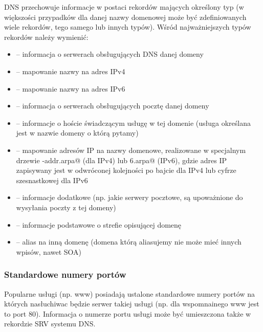 DNS przechowuje informacje w postaci rekordów mających określony typ (w większości przypadków dla danej nazwy domenowej może być zdefiniowanych wiele rekordów, tego samego lub innych typów).
Wśród najważniejszych typów rekordów należy wymienić:
\begin{itemize}
	\item \Verb@NS@    – informacja o serwerach obsługujących DNS danej domeny
	\item \Verb@A@     – mapowanie nazwy na adres IPv4
	\item \Verb@AAAA@  – mapowanie nazwy na adres IPv6
	\item \Verb@MX@    – informacja o serwerach obsługujących pocztę danej domeny
	\item \Verb@SRV@   – informacje o hoście świadczącym usługę w tej domenie (usługa określana jest w nazwie domeny o którą pytamy)
	\item \Verb@PTR@   – mapowanie adresów IP na nazwy domenowe, realizowane w specjalnym drzewie \Verb@in-addr.arpa@ (dla IPv4) lub \Verb@ip6.arpa@ (IPv6),
	                     gdzie adres IP zapisywany jest w odwróconej kolejności po bajcie dla IPv4 lub cyfrze szesnastkowej dla IPv6
	\item \Verb@TXT@   – informacje dodatkowe (np. jakie serwery pocztowe, są upoważnione do wysyłania poczty z tej domeny)
	\item \Verb@SOA@   – informacje podstawowe o strefie opisującej domenę
	\item \Verb@CNAME@ – alias na inną domenę (domena którą aliasujemy nie może mieć innych wpisów, nawet SOA)
\end{itemize}

\subsubsection{Standardowe numery portów}

Popularne usługi (np. www) posiadają ustalone standardowe numery portów na których nasłuchiwac będzie serwer takiej usługi (np. dla wspomnainego www jest to port 80). Informacja o numerze portu usługi może być umieszczona także w rekordzie SRV systemu DNS.
